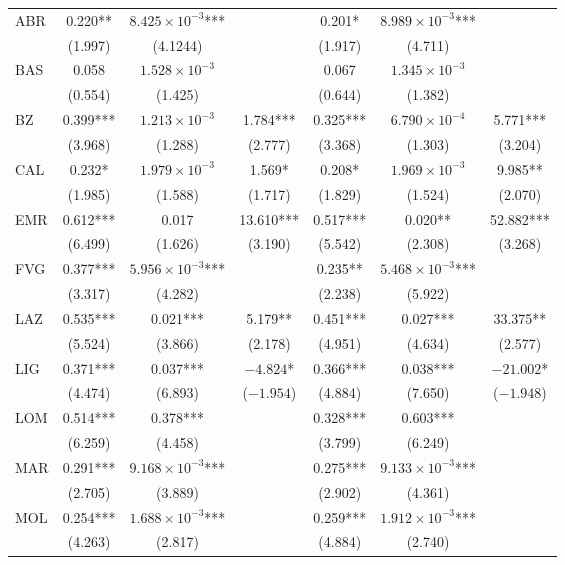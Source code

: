 \documentclass[12pt]{article}
\begin{document}
\begin{longtable}{@{}lcccccc@{}}
        ABR & 0.220** & $8.425 \times 10^{-3}$*** &  & 0.201* & $8.989 \times 10^{-3}$*** &  \\ 
         & (1.997) & (4.1244) &  & (1.917) & (4.711) &  \\
        BAS & 0.058 & $1.528 \times 10^{-3}$ &  & 0.067 & $1.345 \times 10^{-3}$ &  \\ 
         & (0.554) & (1.425) &  & (0.644) & (1.382) &  \\ 
        BZ & 0.399*** & $1.213 \times 10^{-3}$ & 1.784*** & 0.325*** & $6.790 \times 10^{-4}$ & 5.771*** \\ 
         & (3.968) & (1.288) & (2.777) & (3.368) & (1.303) & (3.204) \\ 
        CAL & 0.232* & $1.979 \times 10^{-3}$ & 1.569* & 0.208* & $1.969 \times 10^{-3}$ & 9.985** \\ 
         & (1.985) & (1.588) & (1.717) & (1.829) & (1.524) & (2.070) \\ 
        EMR & 0.612*** & 0.017 & 13.610*** & 0.517*** & 0.020** & 52.882*** \\ 
         & (6.499) & (1.626) & (3.190) & (5.542) & (2.308) & (3.268) \\ 
        FVG & 0.377*** & $5.956 \times 10^{-3}$*** &  & 0.235** & $5.468 \times 10^{-3}$*** &  \\ 
         & (3.317) & (4.282) &  & (2.238) & (5.922) &  \\ 
        LAZ & 0.535*** & 0.021*** & 5.179** & 0.451*** & 0.027*** & 33.375** \\ 
         & (5.524) & (3.866) & (2.178) & (4.951) & (4.634) & (2.577) \\ 
        LIG & 0.371*** & 0.037*** & $-4.824$* & 0.366*** & 0.038*** & $-21.002$* \\ 
         & (4.474) & (6.893) & ($-1.954$) & (4.884) & (7.650) & ($-1.948$) \\ 
        LOM & 0.514*** & 0.378*** &  & 0.328*** & 0.603*** &  \\ 
         & (6.259) & (4.458) &  & (3.799) & (6.249) &  \\ 
        MAR & 0.291*** & $9.168 \times 10^{-3}$*** &  & 0.275*** & $9.133 \times 10^{-3}$*** &  \\ 
         & (2.705) & (3.889) &  & (2.902) & (4.361) &  \\ 
        MOL & 0.254*** & $1.688 \times 10^{-3}$*** &  & 0.259*** & $1.912 \times 10^{-3}$*** &  \\ 
         & (4.263) & (2.817) &  & (4.884) & (2.740) &  \\ 

\end{longtable}
\end{document}
